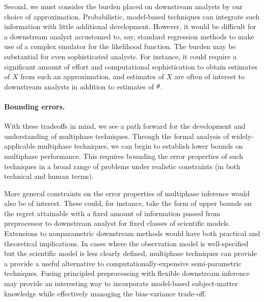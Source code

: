 Second, we must consider the burden placed on downstream analysts by our choice of approximation.
Probabilistic, model-based techniques can integrate such information with little additional development.
However, it would be difficult for a downstream analyst accustomed to, say, standard regression methods to make use of a complex emulator for the likelihood function.
The burden may be substantial for even sophisticated analysts.
For instance, it could require a significant amount of effort and computational sophistication to obtain estimates of $X$ from such an approximation, and estimates of $X$ are often of interest to downstream analysts in addition to estimates of $\theta$.

\paragraph{Bounding errors.}
With these tradeoffs in mind, we see a path forward for the development and understanding of multiphase techniques.
Through the formal analysis of widely-applicable multiphase techniques, we can begin to establish lower bounds on multiphase performance.
This requires bounding the error properties of such techniques in a broad range of problems under realistic constraints (in both technical and human terms).

More general constraints on the error properties of multiphase inference would also be of interest.
These could, for instance, take the form of upper bounds on the regret attainable with a fixed amount of information passed from preprocessor to downstream analyst for fixed classes of scientific models.
Extensions to nonparametric downstream methods would have both practical and theoretical implications.
In cases where the observation model is well-specified but the scientific model is less clearly defined, multiphase techniques can provide a provide a useful alternative to computationally-expensive semi-parametric techniques.
Fusing principled preprocessing with flexible downstream inference may provide an interesting way to incorporate model-based subject-matter knowledge while effectively managing the bias-variance trade-off.

